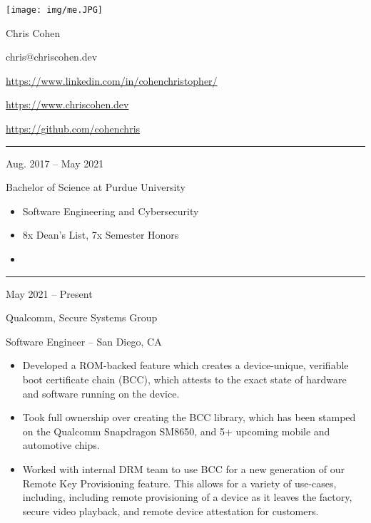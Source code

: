 \documentclass[a4paper]{article}
\newlength{\cvcolumngapwidth}
\newlength{\cvleftcolumnwidth}
\newlength{\cvrightcolumnwidth}
\newcommand{\cvnamestyle}[1]{{\Huge\cvnamefont\textcolor{cvnamecolor}{#1}}}
\newcommand{\cvsectionstyle}[1]{{\normalsize\cvsectionfont\textcolor{cvsectioncolor}{#1}}}
\newcommand{\cvtitlestyle}[1]{{\large\cvtitlefont\textcolor{cvtitlecolor}{#1}}}
\newcommand{\cvdurationstyle}[1]{{\small\cvdurationfont\textcolor{cvdurationcolor}{#1}}}
\newcommand{\italicstyle}[1]{{\small\italicfont\textcolor{cvsectioncolor}{#1}}}
\newlength{\cvafteritemskipamount}
\newlength{\cvaftersectionskipamount}
\newlength{\cvafternameskipamount}
\newlength{\cvafterpersonalinfolineskipamount}
\newlength{\cvaftertitleskipamount}
\newlength{\cvparskip}
\newcommand{\cvpersonalinfo}[2]{
    \begin{minipage}[t]{\cvleftcolumnwidth}
        \vspace{0mm} %
        \raggedleft #1
    \end{minipage}%
    \hspace{\cvcolumngapwidth}%
    \begin{minipage}[t]{\cvrightcolumnwidth}
        \vspace{0mm} %
        #2
    \end{minipage}

    \vspace{\cvafteritemskipamount}
}
\newcommand{\cvname}[1]{
    \cvnamestyle{#1}

    \vspace{\cvafternameskipamount}
}
\newcommand{\cvpersonalinfolinewithicon}[3]{
    \raisebox{.5\fontcharht\font`E-.5\height}{\texttt{[image: \#2]}}
    #3

    \vspace{\cvafterpersonalinfolineskipamount}
}
\newcommand{\cvsection}[1]{
    \begin{minipage}[t]{\cvleftcolumnwidth}
        \raggedleft\cvsectionstyle{#1}
    \end{minipage}%
    \hspace{\cvcolumngapwidth}%
    \begin{minipage}[t]{\cvrightcolumnwidth}
        \textcolor{cvrulecolor}{\rule{\cvrightcolumnwidth}{0.3mm}}
    \end{minipage}

    \vspace{\cvaftersectionskipamount}
}
\newcommand{\cvitem}[2]{
    \begin{minipage}[t]{\cvleftcolumnwidth}
        \raggedleft #1
    \end{minipage}%
    \hspace{\cvcolumngapwidth}%
    \begin{minipage}[t]{\cvrightcolumnwidth}
        \setlength{\parskip}{\cvparskip} #2
    \end{minipage}

    \vspace{\cvafteritemskipamount}
}
\newcommand{\cvtitle}[1]{
    \cvtitlestyle{#1}

    \vspace{\cvaftertitleskipamount}
    \vspace{-\cvparskip}
}
\begin{document}

\cvpersonalinfo{
    \texttt{[image: img/me.JPG]}
}{
    \cvname{\textcolor{emphasiscolor}{Chris Cohen}}


    \cvpersonalinfolinewithicon{height=4mm}{img/email.png}{
      chris@chriscohen.dev
    }

    \cvpersonalinfolinewithicon{height=4mm}{img/linkedin.png}{
      \href{https://www.linkedin.com/in/cohenchristopher/}{https://www.linkedin.com/in/cohenchristopher/}
    }

    \cvpersonalinfolinewithicon{height=4mm}{img/website.png}{
      \href{https://www.chriscohen.dev}{https://www.chriscohen.dev}
    }

    \cvpersonalinfolinewithicon{height=4mm}{img/github.png}{
      \href{https://github.com/cohenchris}{https://github.com/cohenchris}
    }
}


\cvsection{\LARGE \textcolor{emphasiscolor}{EDUCATION}}

\cvitem{
    \cvdurationstyle{Aug. 2017 -- May 2021}
}{
  \cvtitle{Bachelor of Science at Purdue University}


    \begin{itemize}[leftmargin=*]
      \item Software Engineering and Cybersecurity
      \item 8x Dean's List, 7x Semester Honors
      \item \large{\regularfont{\textcolor{emphasiscolor}{3.83 GPA}}}
    \end{itemize}
}


\cvsection{\LARGE \textcolor{emphasiscolor}{EMPLOYMENT}}

\cvitem{
    \cvdurationstyle{May 2021 -- Present}
}{
    \cvtitle{Qualcomm, Secure Systems Group}

    \italicstyle{Software Engineer  --  San Diego, CA}

    \normalsize
    \begin{itemize}[leftmargin=*]
      \item Developed a ROM-backed feature which creates a device-unique, verifiable boot certificate chain (BCC), which attests to the exact state of hardware and software running on the device.
      \item Took full ownership over creating the BCC library, which has been stamped on the Qualcomm Snapdragon SM8650, and 5+ upcoming mobile and automotive chips.
      \item Worked with internal DRM team to use BCC for a new generation of our Remote Key Provisioning feature. This allows for a variety of use-cases, including, including remote provisioning of a device as it leaves the factory, secure video playback, and remote device attestation for customers.
    \end{itemize}
    \vspace{1mm}
}
\end{document}
